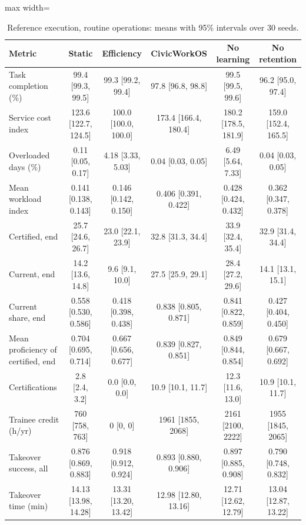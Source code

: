 \documentclass[utf8]{frontiers_suppmat}
\begin{document}
\begin{table}[!htbp]
	\caption{Reference execution, routine operations: means with 95\% intervals over 30 seeds.}
	\label{tab:ext-routine}
	\scriptsize
	\setlength{\tabcolsep}{2pt}
	\begin{adjustbox}{max width=\textwidth}
	\begin{tabular}{@{}lccccc@{}}
		\toprule
		\textbf{Metric} & \textbf{Static} & \textbf{Efficiency} & \textbf{CivicWorkOS} & \textbf{No learning} & \textbf{No retention}\\
		\midrule
Task completion (\%) & 99.4 [99.3, 99.5] & 99.3 [99.2, 99.4] & 97.8 [96.8, 98.8] & 99.5 [99.5, 99.6] & 96.2 [95.0, 97.4]\\
Service cost index & 123.6 [122.7, 124.5] & 100.0 [100.0, 100.0] & 173.4 [166.4, 180.4] & 180.2 [178.5, 181.9] & 159.0 [152.4, 165.5]\\
Overloaded days (\%) & 0.11 [0.05, 0.17] & 4.18 [3.33, 5.03] & 0.04 [0.03, 0.05] & 6.49 [5.64, 7.33] & 0.04 [0.03, 0.05]\\
Mean workload index & 0.141 [0.138, 0.143] & 0.146 [0.142, 0.150] & 0.406 [0.391, 0.422] & 0.428 [0.424, 0.432] & 0.362 [0.347, 0.378]\\
Certified, end & 25.7 [24.6, 26.7] & 23.0 [22.1, 23.9] & 32.8 [31.3, 34.4] & 33.9 [32.4, 35.4] & 32.9 [31.4, 34.4]\\
Current, end & 14.2 [13.6, 14.8] & 9.6 [9.1, 10.0] & 27.5 [25.9, 29.1] & 28.4 [27.2, 29.6] & 14.1 [13.1, 15.1]\\
Current share, end & 0.558 [0.530, 0.586] & 0.418 [0.398, 0.438] & 0.838 [0.805, 0.871] & 0.841 [0.822, 0.859] & 0.427 [0.404, 0.450]\\
Mean proficiency of certified, end & 0.704 [0.695, 0.714] & 0.667 [0.656, 0.677] & 0.839 [0.827, 0.851] & 0.849 [0.844, 0.854] & 0.679 [0.667, 0.692]\\
Certifications & 2.8 [2.4, 3.2] & 0.0 [0.0, 0.0] & 10.9 [10.1, 11.7] & 12.3 [11.6, 13.0] & 10.9 [10.1, 11.7]\\
Trainee credit (h/yr) & 760 [758, 763] & 0 [0, 0] & 1961 [1855, 2068] & 2161 [2100, 2222] & 1955 [1845, 2065]\\
Takeover success, all & 0.876 [0.869, 0.883] & 0.918 [0.912, 0.924] & 0.893 [0.880, 0.906] & 0.897 [0.885, 0.908] & 0.790 [0.748, 0.832]\\
Takeover time (min) & 14.13 [13.98, 14.28] & 13.31 [13.20, 13.42] & 12.98 [12.80, 13.16] & 12.71 [12.62, 12.79] & 13.04 [12.87, 13.22]\\

\end{tabular}
\end{adjustbox}
\end{table}
\end{document}
